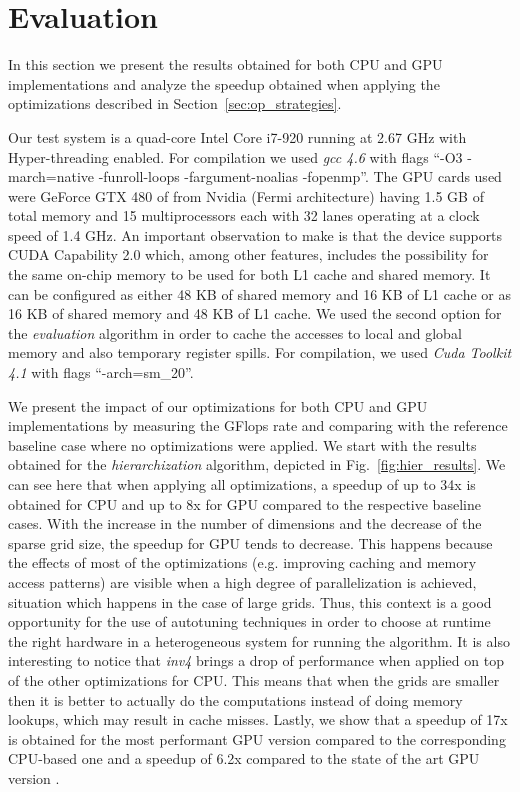 \section{Evaluation}

In this section we present the results obtained for both CPU and GPU
implementations and analyze the speedup obtained when applying the
optimizations described in Section~\ref{sec:op_strategies}.

Our test system is a quad-core Intel Core i7-920 running at 2.67 GHz with
Hyper-threading enabled. For compilation we used \textit{gcc 4.6} with flags
``-O3 -march=native -funroll-loops -fargument-noalias -fopenmp''. The GPU cards
used were GeForce GTX 480 of from Nvidia (Fermi architecture) having 1.5 GB of
total memory and 15 multiprocessors each with 32 lanes operating at a clock
speed of 1.4 GHz. An important observation to make is that the device supports
CUDA Capability 2.0 which, among other features, includes the possibility for
the same on-chip memory to be used for both L1 cache and shared memory. It can
be configured as either 48 KB of shared memory and 16 KB of L1 cache or as 16 KB
of shared memory and 48 KB of L1 cache. We used the second option for the
\textit{evaluation} algorithm in order to cache the accesses to local and global
memory and also temporary register spills. For compilation, we used
\textit{Cuda Toolkit 4.1} with flags ``-arch=sm\_20''.

We present the impact of our optimizations for both CPU and GPU implementations
by measuring the GFlops rate and comparing with the reference baseline case
where no optimizations were applied. We start with the results obtained for the
\textit{hierarchization} algorithm, depicted in Fig.~\ref{fig:hier_results}. We
can see here that when applying all optimizations, a speedup of up to 34x is
obtained for CPU and up to 8x for GPU compared to the respective baseline cases.
With the increase in the number of dimensions and the decrease of the sparse
grid size, the speedup for GPU tends to decrease. This happens because the
effects of most of the optimizations (e.g. improving caching and memory access
patterns) are visible when a high degree of parallelization is achieved,
situation which happens in the case of large grids. Thus, this context is a good
opportunity for the use of autotuning techniques in order to choose at runtime
the right hardware in a heterogeneous system for running the algorithm. It is
also interesting to notice that \textit{inv4} brings a drop of performance when
applied on top of the other optimizations for CPU. This means that when the
grids are smaller then it is better to actually do the computations instead of
doing memory lookups, which may result in cache misses. Lastly, we show that a
speedup of 17x is obtained for the most performant GPU version compared to the
corresponding CPU-based one and a speedup of 6.2x compared to the state of the
art GPU version \cite{murarasu2011}.


